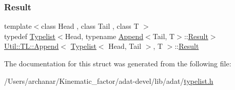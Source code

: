 \subsubsection{\texorpdfstring{Result}{Result}\hspace{0.1cm}{\footnotesize\ttfamily [3/3]}}
{\footnotesize\ttfamily template$<$class Head , class Tail , class T $>$ \\
typedef \mbox{\hyperlink{structUtil_1_1Typelist}{Typelist}}$<$Head, typename \mbox{\hyperlink{structUtil_1_1TL_1_1Append}{Append}}$<$Tail, T$>$\+::\mbox{\hyperlink{structUtil_1_1TL_1_1Append_3_01Typelist_3_01Head_00_01Tail_01_4_00_01T_01_4_ae4e9d942296ff4d7021b2482ec712082}{Result}}$>$ \mbox{\hyperlink{structUtil_1_1TL_1_1Append}{Util\+::\+T\+L\+::\+Append}}$<$ \mbox{\hyperlink{structUtil_1_1Typelist}{Typelist}}$<$ Head, Tail $>$, T $>$\+::\mbox{\hyperlink{structUtil_1_1TL_1_1Append_3_01Typelist_3_01Head_00_01Tail_01_4_00_01T_01_4_ae4e9d942296ff4d7021b2482ec712082}{Result}}}



The documentation for this struct was generated from the following file\+:\begin{DoxyCompactItemize}
\item 
/\+Users/archanar/\+Kinematic\+\_\+factor/adat-\/devel/lib/adat/\mbox{\hyperlink{adat-devel_2lib_2adat_2typelist_8h}{typelist.\+h}}\end{DoxyCompactItemize}
